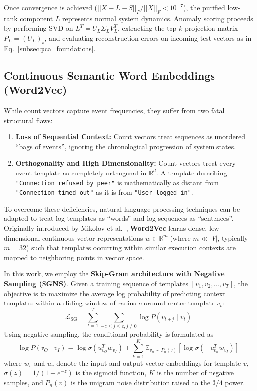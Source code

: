Once convergence is achieved ($||X - L - S||_F / ||X||_F < 10^{-7}$), the purified low-rank component $L$ represents normal system dynamics. Anomaly scoring proceeds by performing SVD on $L^T = U_L \Sigma_L V_L^T$, extracting the top-$k$ projection matrix $P_L = (U_L)_k$, and evaluating reconstruction errors on incoming test vectors as in Eq.~\eqref{subsec:pca_foundations}.

\subsection{Continuous Semantic Word Embeddings (Word2Vec)}
\label{subsec:word2vec_foundations}
While count vectors capture event frequencies, they suffer from two fatal structural flaws:
\begin{enumerate}
    \item \textbf{Loss of Sequential Context:} Count vectors treat sequences as unordered ``bags of events'', ignoring the chronological progression of system states.
    \item \textbf{Orthogonality and High Dimensionality:} Count vectors treat every event template as completely orthogonal in $\mathbb{R}^d$. A template describing \texttt{"Connection refused by peer"} is mathematically as distant from \texttt{"Connection timed out"} as it is from \texttt{"User logged in"}.
\end{enumerate}

To overcome these deficiencies, natural language processing techniques can be adapted to treat log templates as ``words'' and log sequences as ``sentences''. Originally introduced by Mikolov et al.~\cite{mikolov2013efficient}, \textbf{Word2Vec} learns dense, low-dimensional continuous vector representations $w \in \mathbb{R}^m$ (where $m \ll |V|$, typically $m=32$) such that templates occurring within similar execution contexts are mapped to neighboring points in vector space.

In this work, we employ the \textbf{Skip-Gram architecture with Negative Sampling (SGNS)}. Given a training sequence of templates $[v_1, v_2, \dots, v_T]$, the objective is to maximize the average log probability of predicting context templates within a sliding window of radius $c$ around center template $v_t$:
\begin{equation}
    \mathcal{L}_{\text{SG}} = \sum_{t=1}^T \sum_{-c \le j \le c, j \ne 0} \log P(v_{t+j} \mid v_t)
\end{equation}
Using negative sampling, the conditional probability is formulated as:
\begin{equation}
    \log P(v_O \mid v_I) = \log \sigma(u_{v_O}^T w_{v_I}) + \sum_{k=1}^K \mathbb{E}_{v_n \sim P_n(v)} \left[ \log \sigma(-u_{v_n}^T w_{v_I}) \right]
\end{equation}
where $w_v$ and $u_v$ denote the input and output vector embeddings for template $v$, $\sigma(z) = 1 / (1 + e^{-z})$ is the sigmoid function, $K$ is the number of negative samples, and $P_n(v)$ is the unigram noise distribution raised to the $3/4$ power.

